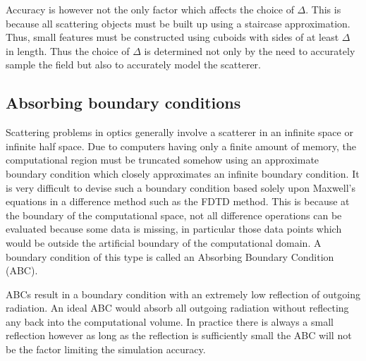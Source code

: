 \documentclass[a4paper, 12pt]{article}
\begin{document}
	Accuracy is however not the only factor which affects the choice of
	$\Delta$. This is because all scattering objects must be built up
	using a staircase approximation. Thus, small features must be
	constructed using cuboids with sides of at least $\Delta$ in
	length. Thus the choice of $\Delta$ is determined not only by the need
	to accurately sample the field but also to accurately model the scatterer.
	\subsection{Absorbing boundary conditions}
	\label{sec:fdtd:abcpml}
	Scattering problems in
	optics generally involve a scatterer in an infinite space or infinite
	half space. Due to computers having only a finite amount of memory,
	the computational region must be truncated somehow using an approximate
	boundary condition which closely approximates an infinite boundary
	condition. It is very difficult to devise such a boundary
	condition based solely upon Maxwell's equations in a difference method
	such as the FDTD method. This is because at the boundary of the
	computational space, not all difference operations can be evaluated
	because some data is missing, in particular those data points which
	would be outside the artificial boundary of the computational
	domain. A boundary condition of this type is called an Absorbing Boundary Condition (ABC).
	
	ABCs result in a boundary condition with an extremely low reflection
	of outgoing radiation. An ideal ABC would absorb all outgoing
	radiation without reflecting any back into the computational
	volume. In practice there is always a small reflection however as long
	as the reflection is sufficiently small the ABC will not be the factor
	limiting the simulation accuracy.
	
\end{document}
